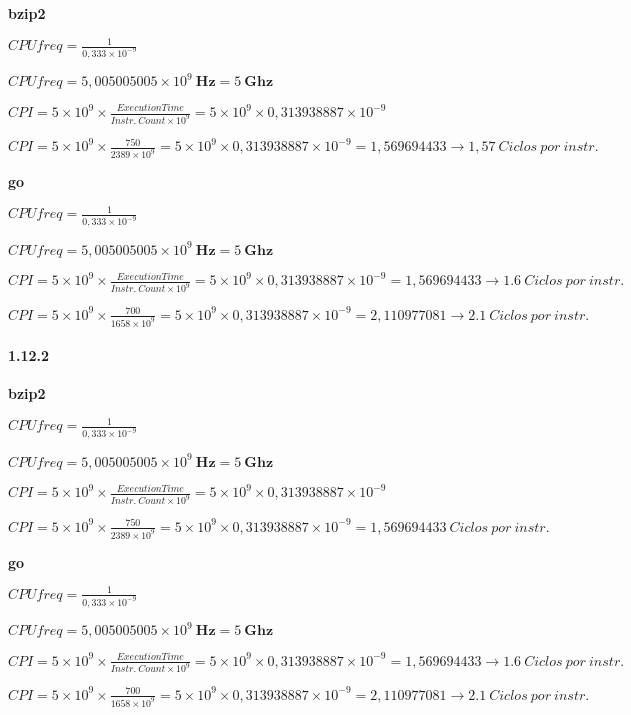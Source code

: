 \documentclass{article}
\begin{document}
{\flushleft

\textbf{bzip2}

$CPUfreq = \frac{1}{0,333 \times 10^{-9}}$

$CPUfreq = 5,005005005 \times 10^{9}\ \textbf{Hz} = 5\ \textbf{Ghz}$

$CPI = 5 \times 10^{9} \times 
\frac{Execution Time}{Instr.\ Count \times 10^{9}} = 5 \times 10^{9} \times 
0,313938887 \times 10^{-9}$

$CPI = 5 \times 10^{9} \times 
\frac{750}{2389 \times 10^{9}} = 5 \times 10^{9} \times 
0,313938887 \times 10^{-9} = 1,569694433 \rightarrow 1,57\ Ciclos\ por\ instr.$

}

{\flushleft

\textbf{go}

$CPUfreq = \frac{1}{0,333 \times 10^{-9}}$

$CPUfreq = 5,005005005 \times 10^{9}\ \textbf{Hz} = 5\ \textbf{Ghz}$

$CPI = 5 \times 10^{9} \times 
\frac{Execution Time}{Instr.\ Count \times 10^{9}} = 5 \times 10^{9} \times 
0,313938887 \times 10^{-9} = 1,569694433 \rightarrow 1.6\ Ciclos\ por\ instr.$

$CPI = 5 \times 10^{9} \times 
\frac{700}{1658 \times 10^{9}} = 5 \times 10^{9} \times 
0,313938887 \times 10^{-9} = 2,110977081 \rightarrow 2.1\ Ciclos\ por\ instr. $

}

\paragraph{1.12.2}

{\flushleft

\textbf{bzip2}

$CPUfreq = \frac{1}{0,333 \times 10^{-9}}$

$CPUfreq = 5,005005005 \times 10^{9}\ \textbf{Hz} = 5\ \textbf{Ghz}$

$CPI = 5 \times 10^{9} \times 
\frac{Execution Time}{Instr.\ Count \times 10^{9}} = 5 \times 10^{9} \times 
0,313938887 \times 10^{-9}$

$CPI = 5 \times 10^{9} \times 
\frac{750}{2389 \times 10^{9}} = 5 \times 10^{9} \times 
0,313938887 \times 10^{-9} = 1,569694433\ Ciclos\ por\ instr.$

}

{\flushleft

\textbf{go}

$CPUfreq = \frac{1}{0,333 \times 10^{-9}}$

$CPUfreq = 5,005005005 \times 10^{9}\ \textbf{Hz} = 5\ \textbf{Ghz}$

$CPI = 5 \times 10^{9} \times 
\frac{Execution Time}{Instr.\ Count \times 10^{9}} = 5 \times 10^{9} \times 
0,313938887 \times 10^{-9} = 1,569694433 \rightarrow 1.6\ Ciclos\ por\ instr.$

$CPI = 5 \times 10^{9} \times 
\frac{700}{1658 \times 10^{9}} = 5 \times 10^{9} \times 
0,313938887 \times 10^{-9} = 2,110977081 \rightarrow 2.1\ Ciclos\ por\ instr. $

}
\end{document}
